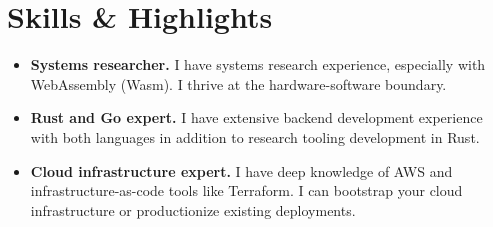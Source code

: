 \section{Skills \& Highlights}

\begin{itemize}[noitemsep, topsep=0pt]
    \item
        \textbf{Systems researcher.} I have systems research experience, especially with WebAssembly (Wasm). I thrive at the hardware-software boundary.
    \item
        \textbf{Rust and Go expert.} I have extensive backend development experience with both languages in addition to research tooling development in Rust.
    \item
        \textbf{Cloud infrastructure expert.} I have deep knowledge of AWS and infrastructure-as-code tools like Terraform. I can bootstrap your cloud infrastructure or productionize existing deployments.
\end{itemize}
